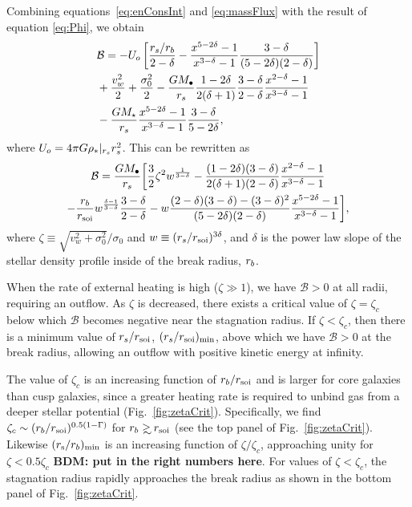 Combining equations~\eqref{eq:enConsInt} and \eqref{eq:massFlux} with the result of equation \eqref{eq:Phi}, we obtain 
\begin{align}
  &\mathcal{B} = -U_o\left[\frac{r_s/r_b}{2-\delta}-\frac{x^{5-2\delta}-1}{x^{3-\delta}-1}\frac{3-\delta}{(5-2\delta)(2-\delta)}\right]\nonumber\\
  &+\frac{v_w^2}{2}+\frac{\sigma_0^2}{2}- \frac{G M_{\bullet}}{r_s}
  \frac{1-2\delta}{2(\delta+1)} \frac{3-\delta}{2-\delta}\frac{x^{2-\delta}-1}{x^{3-\delta}-1}
  \nonumber\\
  &-\frac{G M_\star}{r_s}
  \frac{x^{5-2\delta}-1}{x^{3-\delta}-1}\frac{3-\delta}{5-2\delta},
\end{align}
where $U_o=4 \pi G \rho_*|_{r_s} r_s^2$.  This can be rewritten as
\begin{multline}
  \mathcal{B} =\frac{G M_{\bullet}}{r_s} 
\biggl[
  \frac{3}{2} \zeta^2 w^{\frac{1}{3 -\delta}}
  -\frac{(1-2\delta)(3-\delta)}{2(\delta+1)(2-\delta)}  \frac{x^{2  -\delta}-1}{x^{3-\delta}-1}\\
  -\frac{r_b}{r_{\rm soi}} w^{\frac{\delta-1}{3-\delta}} \frac{3 -\delta}{2 -\delta} 
  -w \frac{(2-\delta)(3-\delta)-(3-\delta)^{2}}{(5-2\delta)(2-\delta)} \frac{x^{5-2\delta}-1}{x^{3-\delta}-1}
\biggr],
\label{eq:enthAnal}
\end{multline}
where $\zeta \equiv \sqrt{v_w^2+\sigma_0^2}/\sigma_0$ and $w\equiv (r_s/r_{\rm soi})^{3\delta}$, and
$\delta$ is the power law slope of the stellar density profile inside
of the break radius, $r_b$.

When the rate of external heating is high ($\zeta \gg 1$), we have $\mathcal{B} > 0$ at all radii, requiring an outflow.  As $\zeta$ is decreased, there exists a critical value of $\zeta = \zeta_{c}$ below which $\mathcal{B}$ becomes negative near the stagnation radius.  If $\zeta<\zeta_c$, then there is a minimum value of $r_s/r_{\rm soi}$, $(r_s/r_{\rm soi})_{\rm min}$, above which we have $\mathcal{B} > 0$ at the break radius, allowing an outflow with positive kinetic energy at infinity.  

The value of $\zeta_c$ is an increasing function of $r_{b}/r_{\rm soi}$ and is larger for core galaxies than cusp galaxies, since a greater heating rate is required to unbind gas from a deeper stellar potential (Fig.~\ref{fig:zetaCrit}).  Specifically, we find $\zeta_c\sim (r_b/r_{\rm soi})^{0.5(1-\Gamma)}$ for $\rb\gsim\rsoi$ (see the top panel of
Fig.~\ref{fig:zetaCrit}). Likewise $(r_{\rm s}/r_{b})_{\rm min}$ is an increasing function of $\zeta/\zeta_{c}$, approaching unity for $\zeta < 0.5\zeta_c$ {\bf BDM: put in the right numbers here}.  For values of $\zeta<\zeta_c$, the stagnation radius rapidly approaches the break radius as shown in the
bottom panel of Fig.~\ref{fig:zetaCrit}.

